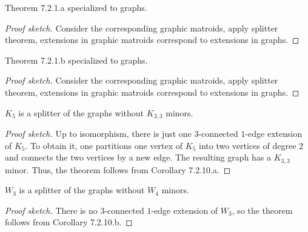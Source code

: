 \begin{corollary}[7.2.10.a]
  \label{cor:7.2.10.a}
  Theorem 7.2.1.a specialized to graphs.
\end{corollary}

\begin{proof}[Proof sketch]
  Consider the corresponding graphic matroids, apply splitter theorem, extensions in graphic matroids correspond to extensions in graphs.
\end{proof}

\begin{corollary}[7.2.10.b]
  \label{cor:7.2.10.b}
  Theorem 7.2.1.b specialized to graphs.
\end{corollary}

\begin{proof}[Proof sketch]
  Consider the corresponding graphic matroids, apply splitter theorem, extensions in graphic matroids correspond to extensions in graphs.
\end{proof}

\begin{theorem}[7.2.11.a]
  \label{thm:7.2.11.a}
  $K_{5}$ is a splitter of the graphs without $K_{3,3}$ minors.
\end{theorem}

\begin{proof}[Proof sketch]
  Up to isomorphism, there is just one $3$-connected $1$-edge extension of $K_{5}$. To obtain it, one partitions one vertex of $K_{5}$ into two vertices of degree $2$ and connects the two vertices by a new edge. The resulting graph has a $K_{3,3}$ minor. Thus, the theorem follows from Corollary 7.2.10.a.
\end{proof}

\begin{theorem}[7.2.11.b]
  \label{thm:7.2.11.b}
  $W_{3}$ is a splitter of the graphs without $W_{4}$ minors.
\end{theorem}

\begin{proof}[Proof sketch]
  There is no $3$-connected $1$-edge extension of $W_{3}$, so the theorem follows from Corollary 7.2.10.b.
\end{proof}


